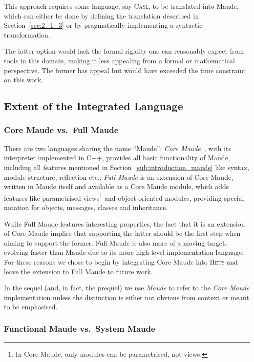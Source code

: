 \documentclass[11pt]{article}
\newcommand{\Casl}{\textsc{Casl}}
\newcommand{\Hets}{\textsc{Hets}}
\begin{document}
This approach requires some language, say \Casl{}, to be translated into Maude, which can either be done by defining the translation described in Section~\ref{sec:2_1_3} or by pragmatically implementing a syntactic transformation.

The latter option would lack the formal rigidity one can reasonably expect from tools in this domain, making it less appealing from a formal or mathematical perspective. The former has appeal but would have exceeded the time constraint on this work.


\subsection{Extent of the Integrated Language}
\label{sec:2_2}

\subsubsection{Core Maude vs.\ Full Maude}
\label{sec:2_2_1}

There are two languages sharing the name ``Maude'': \emph{Core Maude}~\cite{Clavel:2002}, with its interpreter implemented in C++, provides all basic functionality of Maude, including all features mentioned in Section~\ref{sub:introduction_maude} like syntax, module structure, reflection etc.; \emph{Full Maude} is an extension of Core Maude, written in Maude itself and available as a Core Maude module, which adds features like parametrised views\footnote{In Core Maude, only modules can be parametrised, not views.} and object-oriented modules, providing special notation for objects, messages, classes and inheritance.

While Full Maude features interesting properties, the fact that it is an extension of Core Maude implies that supporting the latter should be the first step when aiming to support the former. Full Maude is also more of a moving target, evolving faster than Maude due to its more high-level implementation language. For these reasons we chose to begin by integrating Core Maude into \Hets{} and leave the extension to Full Maude to future work.

In the sequel (and, in fact, the prequel) we use \emph{Maude} to refer to the \emph{Core Maude} implementation unless the distinction is either not obvious from context or meant to be emphasised.


\subsubsection{Functional Maude vs.\ System Maude}
\label{sec:2_2_2}
\end{document}
